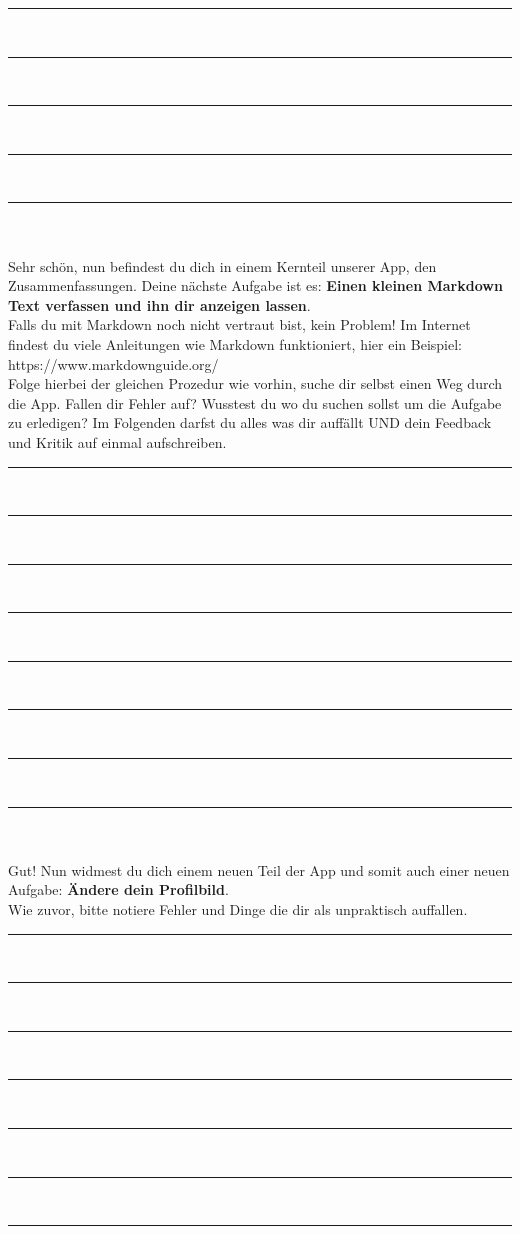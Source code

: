 \noindent\rule{\textwidth}{0.4pt}\\
\noindent\rule{\textwidth}{0.4pt}\\
\noindent\rule{\textwidth}{0.4pt}\\
\noindent\rule{\textwidth}{0.4pt}\\
\noindent\rule{\textwidth}{0.4pt}\\\\
Sehr schön, nun befindest du dich in einem Kernteil unserer App, den Zusammenfassungen. Deine nächste Aufgabe ist es: \textbf{Einen kleinen Markdown Text verfassen und ihn dir anzeigen lassen}.\\
Falls du mit Markdown noch nicht vertraut bist, kein Problem! Im Internet findest du viele Anleitungen wie Markdown funktioniert, hier ein Beispiel: https://www.markdownguide.org/ \\
Folge hierbei der gleichen Prozedur wie vorhin, suche dir selbst einen Weg durch die App. Fallen dir Fehler auf? Wusstest du wo du suchen sollst um die Aufgabe zu erledigen? Im Folgenden darfst du alles was dir auffällt UND dein Feedback und Kritik auf einmal aufschreiben.\\
\noindent\rule{\textwidth}{0.4pt}\\
\noindent\rule{\textwidth}{0.4pt}\\
\noindent\rule{\textwidth}{0.4pt}\\
\noindent\rule{\textwidth}{0.4pt}\\
\noindent\rule{\textwidth}{0.4pt}\\
\noindent\rule{\textwidth}{0.4pt}\\
\noindent\rule{\textwidth}{0.4pt}\\
\noindent\rule{\textwidth}{0.4pt}\\\\
Gut! Nun widmest du dich einem neuen Teil der App und somit auch einer neuen Aufgabe: \textbf{Ändere dein Profilbild}. \\
Wie zuvor, bitte notiere Fehler und Dinge die dir als unpraktisch auffallen.\\
\noindent\rule{\textwidth}{0.4pt}\\
\noindent\rule{\textwidth}{0.4pt}\\
\noindent\rule{\textwidth}{0.4pt}\\
\noindent\rule{\textwidth}{0.4pt}\\
\noindent\rule{\textwidth}{0.4pt}\\
\noindent\rule{\textwidth}{0.4pt}\\
\noindent\rule{\textwidth}{0.4pt}\\\\

